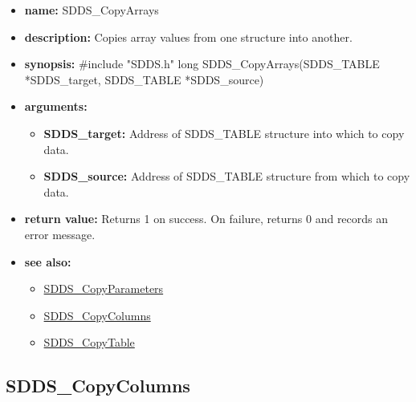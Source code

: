 \documentclass[11pt]{article}
\newcommand{\progref}[1]{\hyperref{SDDS_#1}{{\tt SDDS\_#1} (}{)}{SDDS_#1}}
\begin{document}
\begin{itemize}
\item {\bf name:}\newline
SDDS\_CopyArrays
\item {\bf description:}\newline
Copies array values from one structure into another.
\item {\bf synopsis:} \#include "SDDS.h"\newline
long SDDS\_CopyArrays(SDDS\_TABLE *SDDS\_target, SDDS\_TABLE *SDDS\_source)
\item {\bf arguments:}
\begin{itemize}
\item {\bf SDDS\_target:} Address of SDDS\_TABLE structure into which to copy data.
\item {\bf SDDS\_source:} Address of SDDS\_TABLE structure from which to copy data.
\end{itemize}
\item {\bf return value:}\newline
Returns 1 on success. On failure, returns 0 and records an error message.
\item {\bf see also:}
\begin{itemize}
\item \progref{CopyParameters}
\item \progref{CopyColumns}
\item \progref{CopyTable}
\end{itemize}
\end{itemize}

\subsection{SDDS\_CopyColumns}
\label{SDDS_CopyColumns}
\end{document}
